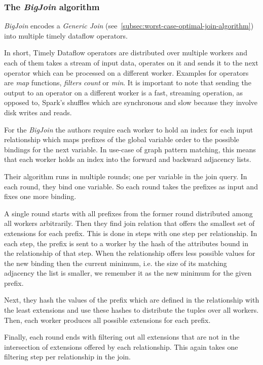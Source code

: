 \subsubsection{The \textit{BigJoin} algorithm}
\textit{BigJoin} encodes a \textit{Generic Join} (see~\cref{subsec:worst-case-optimal-join-algorithm}) into multiple
timely dataflow operators.

In short, Timely Dataflow operators are distributed over multiple workers and each of them takes a stream of input data, operates
on it and sends it to the next operator which can be processed on a different worker.
Examples for operators are \textit{map} functions, \textit{filters} \textit{count} or \textit{min}.
It is important to note that sending the output to an operator on a different worker is a fast, streaming operation, as opposed to,
Spark's shuffles which are synchronous and slow because they involve disk writes and reads.

For the \textit{BigJoin} the authors require each worker to hold an index for each input relationship which maps prefixes
of the global variable order to the possible bindings for the next variable.
In use-case of graph pattern matching, this means that each worker holds an index into the forward and backward adjacency lists.

Their algorithm runs in multiple rounds;
one per variable in the join query.
In each round, they bind one variable.
So each round takes the prefixes as input and fixes one more binding.

A single round starts with all prefixes from the former round distributed among all workers arbitrarily.
Then they find join relation that offers the smallest set of extensions for each prefix.
This is done in steps with one step per relationship.
In each step, the prefix is sent to a worker by the hash of the attributes bound in the relationship of that step.
When the relationship offers less possible values for the new binding then the current minimum, i.e. the size of its matching adjacency
the list is smaller, we remember it as the new minimum for the given prefix.

Next, they hash the values of the prefix which are defined in the relationship with the least extensions and use these hashes to
distribute the tuples over all workers.
Then, each worker produces all possible extensions for each prefix.

Finally, each round ends with filtering out all extensions that are not in the intersection of extensions offered by each relationship.
This again takes one filtering step per relationship in the join.

